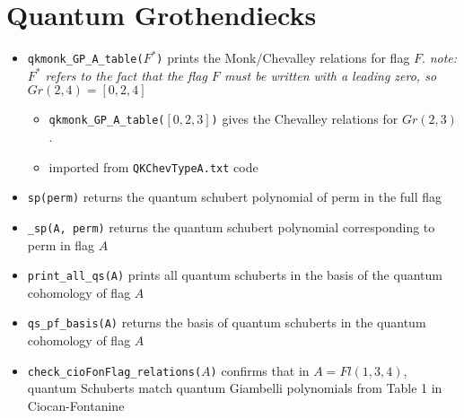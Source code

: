 \documentclass[11pt]{article}
\begin{document}
\section{Quantum Grothendiecks}
\begin{itemize}
    \item \texttt{qkmonk\_GP\_A\_table($F^*$)} prints the Monk/Chevalley relations for flag $F$. \textit{note: $F^*$ refers to the fact that the flag $F$ must be written with a leading zero, so $Gr(2, 4) = [0, 2, 4]$}
    \begin{itemize}
        \item \texttt{qkmonk\_GP\_A\_table($[0, 2, 3]$)} gives the Chevalley relations for $Gr(2, 3)$. 
        \item imported from \texttt{QKChevTypeA.txt} code
    \end{itemize}
    \item \texttt{sp(perm)} returns the quantum schubert polynomial of perm in the full flag
    \item \texttt{\_sp(A, perm)} returns the quantum schubert polynomial corresponding to perm in flag $A$
    \item \texttt{print\_all\_qs(A)} prints all quantum schuberts in the basis of the quantum cohomology of flag $A$
    \item \texttt{qs\_pf\_basis(A)} returns the basis of quantum schuberts in the quantum cohomology of flag $A$
    \item \texttt{check\_cioFonFlag\_relations($A$)} confirms that in $A = Fl(1, 3, 4)$, quantum Schuberts match quantum Giambelli polynomials from Table 1 in Ciocan-Fontanine
\end{itemize}
\end{document}
